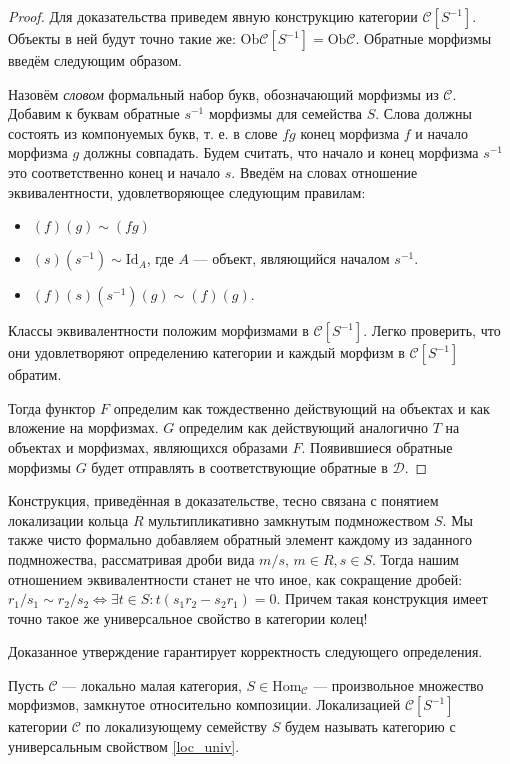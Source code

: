 \documentclass[../hw_main.tex]{subfiles}
\begin{document}
\begin{proof}
  Для доказательства приведем явную конструкцию категории $\mathcal{C}[S^{-1}]$. 
  Объекты в ней будут точно такие же: $\text{Ob}\mathcal{C}[S^{-1}] = \text{Ob}\mathcal{C}$. 
  Обратные морфизмы введём следующим образом.

  Назовём \emph{словом} формальный набор букв, обозначающий морфизмы из $\mathcal{C}$. 
  Добавим к буквам обратные $s^{-1}$ морфизмы для семейства $S$. 
  Слова должны состоять из компонуемых букв, т. е. в слове $fg$ конец морфизма $f$ и начало морфизма $g$ должны совпадать. 
  Будем считать, что начало и конец морфизма $s^{-1}$ это соответственно конец и начало $s$. 
  Введём на словах отношение эквивалентности, удовлетворяющее следующим правилам:
  \begin{itemize}
    \item $(f)(g) \sim (fg)$
    \item $(s)(s^{-1}) \sim \text{Id}_{A}$, где $A$ --- объект, являющийся началом $s^{-1}$.
    \item $(f)(s)(s^{-1})(g) \sim (f)(g)$.
  \end{itemize}
  Классы эквивалентности положим морфизмами в $\mathcal{C}[S^{-1}]$. 
  Легко проверить, что они удовлетворяют определению категории и каждый морфизм в $\mathcal{C}[S^{-1}]$ обратим.

  Тогда функтор $F$ определим как тождественно действующий на объектах и как вложение на морфизмах. 
  $G$ определим как действующий аналогично $T$ на объектах и морфизмах, являющихся образами $F$. 
  Появившиеся обратные морфизмы $G$ будет отправлять в соответствующие обратные в $\mathcal{D}$.
\end{proof}

\begin{to_com}
  Конструкция, приведённая в доказательстве, тесно связана с понятием локализации кольца $R$ мультипликативно замкнутым подмножеством $S$. 
  Мы также чисто формально добавляем обратный элемент каждому из заданного подмножества, рассматривая дроби вида $m/s$, $m\in R, s\in S$. 
  Тогда нашим отношением эквивалентности станет не что иное, как сокращение дробей: $r_1/s_1\sim r_2/s_2 \iff \exists t\in S:t(s_1r_2 - s_2r_1)=0$. 
  Причем такая конструкция имеет точно такое же универсальное свойство в категории колец!
\end{to_com}

Доказанное утверждение гарантирует корректность следующего определения.
\begin{to_def}
  Пусть $\mathcal{C}$ --- локально малая категория, $S\in \text{Hom}_\mathcal{C}$ --- произвольное множество морфизмов, замкнутое относительно композиции. 
  Локализацией $\mathcal{C}[S^{-1}]$ категории $\mathcal{C}$ по локализующему семейству $S$ будем называть категорию с универсальным свойством \eqref{loc_univ}.
\end{to_def}
\end{document}
